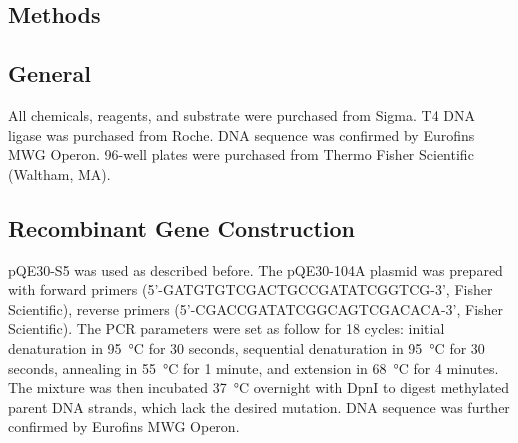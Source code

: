 \begin{refsection}
\section{Methods}

\subsection{General}

All chemicals, reagents, and substrate were purchased from Sigma. T4 DNA ligase
was purchased from Roche. DNA sequence was confirmed by Eurofins MWG Operon.
96-well plates were purchased from Thermo Fisher Scientific (Waltham, MA).

\subsection{Recombinant Gene Construction}

pQE30-S5 was used as described before.\cite{Baker2011} The pQE30-104A plasmid
was prepared with forward primers (5’-GATGTGTCGACTGCCGATATCGGTCG-3’, Fisher
Scientific), reverse primers (5’-CGACCGATATCGGCAGTCGACACA-3’, Fisher
Scientific). The PCR parameters were set as follow for 18 cycles: initial
denaturation in \SI{95}{\celsius} for 30 seconds, sequential denaturation in
\SI{95}{\celsius} for 30 seconds, annealing in \SI{55}{\celsius} for 1 minute,
and extension in \SI{68}{\celsius} for 4 minutes. The mixture was then
incubated \SI{37}{\celsius} overnight with DpnI to digest methylated parent DNA
strands, which lack the desired mutation. DNA sequence was further confirmed by
Eurofins MWG Operon.


\end{refsection}
